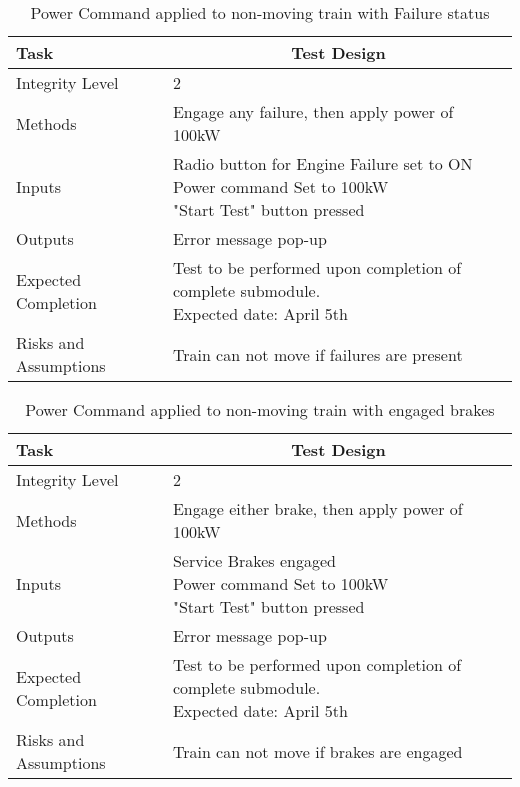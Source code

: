 \documentclass[]{article}
\begin{document}
	\begin{table}[H]
		\centering
		\caption{Power Command applied to non-moving train with Failure status}
		\begin{tabular}{|l|l|}
			\hline
			Task & \multicolumn{1}{c|}{Test Design} \\ \hline
			Integrity Level & 2 \\ \hline
			Methods & Engage any failure, then apply power of 100kW  \\ \hline
			Inputs &  \parbox[t]{10cm}{Radio button for Engine Failure set to ON\\ Power command Set to 100kW\\ "Start Test" button pressed }\\ \hline
			Outputs & Error message pop-up\\ \hline
			Expected Completion & \parbox[t]{10cm}{Test to be performed upon completion of complete submodule.\\ Expected date: April 5th}\\ \hline
			Risks and Assumptions & Train can not move if failures are present\\ \hline
		\end{tabular}
	\end{table}

	\begin{table}[H]
		\centering
		\caption{Power Command applied to non-moving train with engaged brakes}
		\begin{tabular}{|l|l|}
			\hline
			Task & \multicolumn{1}{c|}{Test Design} \\ \hline
			Integrity Level & 2 \\ \hline
			Methods & Engage either brake, then apply power of 100kW  \\ \hline
			Inputs &  \parbox[t]{10cm}{Service Brakes engaged\\ Power command Set to 100kW\\ "Start Test" button pressed }\\ \hline
			Outputs & Error message pop-up\\ \hline
			Expected Completion & \parbox[t]{10cm}{Test to be performed upon completion of complete submodule.\\ Expected date: April 5th}\\ \hline
			Risks and Assumptions & Train can not move if brakes are engaged\\ \hline
		\end{tabular}
	\end{table}
\end{document}
